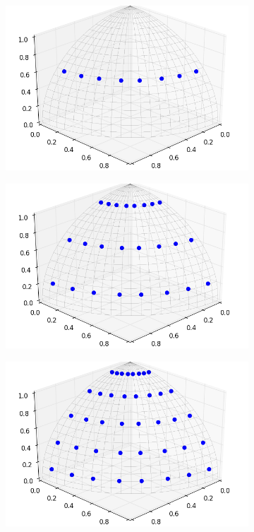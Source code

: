 \begin{figure}[h!]
	\centering
	\begin{subfigure}{0.3\textwidth}
		\centering
		\includegraphics[width=\linewidth]{figures/laydown/GL_2.png}
		\caption{}
		\label{fig:quad-unit-sphere-a}
	\end{subfigure}
	\begin{subfigure}{0.3\textwidth}
		\centering
		\includegraphics[width=\linewidth]{figures/laydown/GL_6.png}
		\caption{}
		\label{fig:quad-unit-sphere-b}
	\end{subfigure}
	\begin{subfigure}{0.3\textwidth}
		\centering
		\includegraphics[width=\linewidth]{figures/laydown/GL_10.png}

\end{subfigure}
\end{figure}
